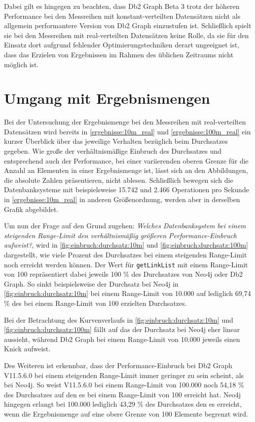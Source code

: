 Dabei gilt es hingegen zu beachten, dass Db2 Graph Beta 3 trotz der höheren Performance bei den Messreihen mit konstant-verteilten Datensätzen nicht als allgemein performantere Version von Db2 Graph einzustufen ist. Schließlich spielt sie bei den Messreihen mit real-verteilten Datensätzen keine Rolle, da sie für den Einsatz dort aufgrund fehlender Optimierungstechniken derart ungeeignet ist, dass das Erzielen von Ergebnissen im Rahmen des üblichen Zeitraums nicht möglich ist.

\section{Umgang mit Ergebnismengen}
\label{auswertung:ergebnismenge}
Bei der Untersuchung der Ergebnismenge bei den Messreihen mit real-verteilten Datensätzen wird bereits in \autoref{ergebnisse:10m_real} und \autoref{ergebnisse:100m_real} ein kurzer Überblick über das jeweilige Verhalten bezüglich beim Durchsatzes gegeben. Wie große der verhältnismäßige Einbruch des Durchsatzes und entsprechend auch der Performance, bei einer variierenden oberen Grenze für die Anzahl an Elementen in einer Ergebnismenge ist, lässt sich an den Abbildungen, die absolute Zahlen präsentieren, nicht ablesen. Schließlich bewegen sich die Datenbanksysteme mit beispielsweise 15.742 und 2.466 Operationen pro Sekunde in \autoref{ergebnisse:10m_real} in anderen Größenordnung, werden aber in derselben Grafik abgebildet. 

Um nun der Frage auf den Grund zugehen: \textit{Welches Datenbanksystem bei einem steigenden Range-Limit den verhältnismäßig größeren Performance-Einbruch aufweist?}, wird in \autoref{fig:einbruch:durchsatz:10m} und \autoref{fig:einbruch:durchsatz:100m} dargestellt, wie viele Prozent des Durchsatzes bei einem steigenden Range-Limit noch erreicht werden können. Der Wert für \texttt{getLinkList} mit einem Range-Limit von 100 repräsentiert dabei jeweils 100 \% des Durchsatzes von Neo4j oder Db2 Graph. So sinkt beispielsweise der Durchsatz bei Neo4j in \autoref{fig:einbruch:durchsatz:10m} bei einem Range-Limit von 10.000 auf lediglich 69,74 \% des bei einem Range-Limit von 100 erzielten Durchsatzes. 

Bei der Betrachtung des Kurvenverlaufs in \autoref{fig:einbruch:durchsatz:10m} und \autoref{fig:einbruch:durchsatz:100m} fällt auf das der Durchsatz bei Neo4j eher linear aussieht, während Db2 Graph bei einem Range-Limit von 10.000 jeweils einen Knick aufweist. 

Des Weiteren ist erkennbar, dass der Performance-Einbruch bei Db2 Graph V11.5.6.0 bei einem steigenden Range-Limit immer geringer zu sein scheint, als bei Neo4j. So weist V11.5.6.0 bei einem Range-Limit von 100.000 noch 54,18 \% des Durchsatzes auf den es bei einem Range-Limit von 100 erreicht hat. Neo4j hingegen erlangt bei 100.000 lediglich 43,29 \% des Durchsatzes den es erreicht, wenn die Ergebnismenge auf eine obere Grenze von 100 Elemente begrenzt wird. 

